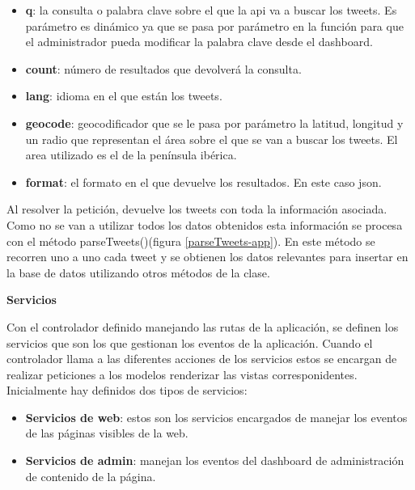 \begin{itemize}

\item \textbf{q}: la consulta o palabra clave sobre el que la api va a buscar los tweets. Es parámetro es dinámico ya que se pasa por parámetro en la función para que el administrador pueda modificar la palabra clave desde el dashboard.

\item \textbf{count}: número de resultados que devolverá la consulta.

\item \textbf{lang}: idioma en el que están los tweets.

\item \textbf{geocode}: geocodificador que se le pasa por parámetro la latitud, longitud y un radio que representan el área sobre el que se van a buscar los tweets. El area utilizado es el de la península ibérica.

\item \textbf{format}: el formato en el que devuelve los resultados. En este caso json.

\end{itemize} 


Al resolver la petición, devuelve los tweets con toda la información asociada. Como no se van a utilizar todos los datos obtenidos esta información se procesa con el método parseTweets()(figura \ref{parseTweets-app}). En este método se recorren uno a uno cada tweet y se obtienen los datos relevantes para insertar en la base de datos utilizando otros métodos de la clase.


\textbf{Servicios}


Con el controlador definido manejando las rutas de la aplicación, se definen los servicios que son los que gestionan los eventos de la aplicación. Cuando el controlador llama a las diferentes acciones de los servicios estos se encargan de realizar peticiones a los modelos renderizar las vistas corresponidentes. Inicialmente hay definidos dos tipos de servicios:

\begin{itemize}

\item \textbf{Servicios de web}: estos son los servicios encargados de manejar los eventos de las páginas visibles de la web.

\item \textbf{Servicios de admin}: manejan los eventos del dashboard de administración de contenido de la página.

\end{itemize} 



